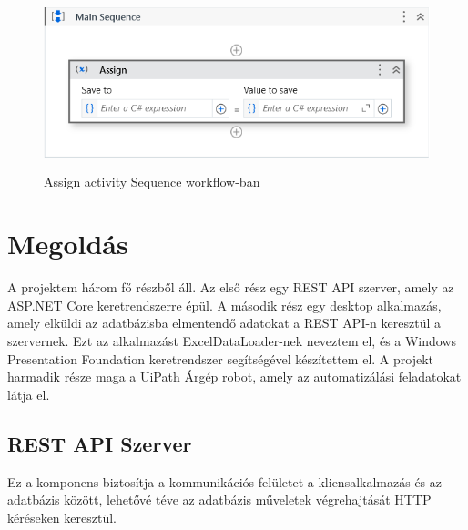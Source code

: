 \documentclass[
]{thesis-ekf}
\theoremstyle{definition}
\theoremstyle{remark}
\begin{document}
	\begin{figure}[!ht]
	\centering
	\includegraphics[height=5cm]{activity}
	\caption{Assign activity Sequence workflow-ban}
	\label{picture-activity}
\end{figure}

\chapter{Megoldás}
A projektem három fő részből áll. Az első rész egy REST API szerver, amely az ASP.NET Core keretrendszerre épül. A második rész egy desktop alkalmazás, amely elküldi az adatbázisba elmentendő adatokat a REST API-n keresztül a szervernek. Ezt az alkalmazást ExcelDataLoader-nek neveztem el, és a Windows Presentation Foundation keretrendszer segítségével készítettem el. A projekt harmadik része maga a UiPath Árgép robot, amely az automatizálási feladatokat látja el.
\section{REST API Szerver}
Ez a komponens biztosítja a kommunikációs felületet a kliensalkalmazás és az adatbázis között, lehetővé téve az adatbázis műveletek végrehajtását HTTP kéréseken keresztül.
\end{document}
